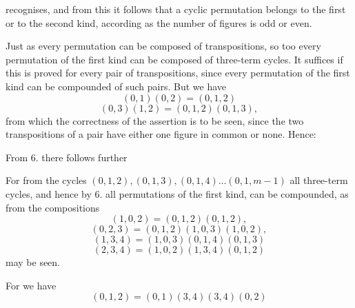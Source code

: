 recognises, and from this it follows that a cyclic permutation belongs to the first or to the second kind, according as the number of figures is odd or even.

Just as every permutation can be composed of transpositions, so too every permutation of the first kind can be composed of three-term cycles. It suffices if this is proved for every pair of transpositions, since every permutation of the first kind can be compounded of such pairs. But we have
\[
(0, 1)(0, 2) = (0, 1, 2)
\]
\[
(0, 3)(1, 2) = (0, 1, 2)(0, 1, 3),
\]
from which the correctness of the assertion is to be seen, since the two transpositions of a pair have either one figure in common or none. Hence:


From 6. there follows further


For from the cycles $(0, 1, 2), (0, 1, 3), (0, 1, 4) \dots (0, 1, m - 1)$ all three-term cycles, and hence by 6. all permutations of the first kind, can be compounded, as from the compositions
\[
(1, 0, 2) = (0, 1, 2)(0, 1, 2),
\]
\[
(0, 2, 3) = (0, 1, 2)(1, 0, 3)(1, 0, 2),
\]
\[
(1, 3, 4) = (1, 0, 3)(0, 1, 4)(0, 1, 3)
\]
\[
(2, 3, 4) = (1, 0, 2)(1, 3, 4)(0, 1, 2)
\]
may be seen.


For we have
\[
(0, 1, 2) = (0, 1)(3, 4)(3, 4)(0, 2)
\]
